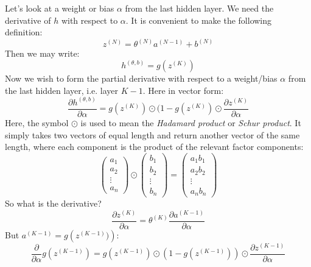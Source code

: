 \documentclass[12pt, a4paper]{article}
\numberwithin{equation}{section}
\begin{document}
Let's look at a weight or bias $\alpha$ from the last hidden layer. We need the derivative of $h$ with respect to $\alpha$. It is convenient to make the following definition:
\begin{equation}
z^{(N)}=\theta^{(N)}a^{(N-1)}+b^{(N)}
\end{equation}
Then we may write:
\begin{equation}
h^{(\theta,b)}=g(z^{(K)})
\end{equation}
Now we wish to form the partial derivative with respect to a weight/bias $\alpha$ from the last hidden layer, i.e. layer $K-1$. Here in vector form:
\begin{equation}
\frac{\partial h^{(\theta,b)}}{\partial\alpha}=g(z^{(K)})\odot(1-g(z^{(K)})\odot\frac{\partial z^{(K)}}{\partial\alpha}
\end{equation}
Here, the symbol $\odot$ is used to mean the \textit{Hadamard product} or \textit{Schur product}. It simply takes two vectors of equal length and return another vector of the same length, where each component is the product of the relevant factor components:
\begin{equation}
\begin{pmatrix}
a_1 \\ a_2 \\ \vdots \\ a_n
\end{pmatrix}
\odot
\begin{pmatrix}
b_1 \\ b_2 \\ \vdots \\ b_n
\end{pmatrix}
=
\begin{pmatrix}
a_1 b_1 \\ a_2 b_2 \\ \vdots \\ a_n b_n
\end{pmatrix}
\end{equation}
So what is the derivative?
\begin{equation}
\frac{\partial z^{(K)}}{\partial\alpha}=\theta^{(K)}\frac{\partial a^{(K-1)}}{\partial\alpha}
\end{equation}
But $a^{(K-1)}=g\left(z^{(K-1)})\right)$:
\begin{equation}
\frac{\partial}{\partial\alpha}g(z^{(K-1)})=g(z^{(K-1)})\odot(1-g(z^{(K-1)}))\odot\frac{\partial z^{(K-1)}}{\partial\alpha}
\end{equation}
\end{document}
